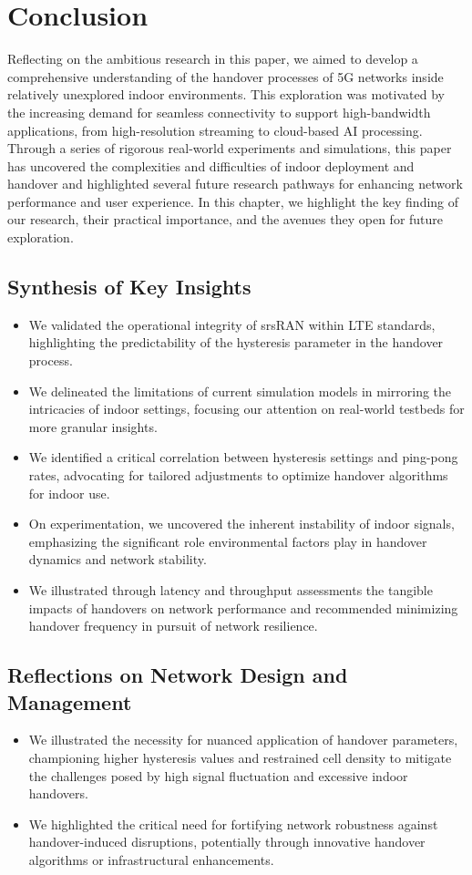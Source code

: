 \chapter{Conclusion}
Reflecting on the ambitious research in this paper, we aimed to develop a comprehensive understanding of the handover processes of 5G networks inside relatively unexplored indoor environments. This exploration was motivated by the increasing demand for seamless connectivity to support high-bandwidth applications, from high-resolution streaming to cloud-based AI processing. Through a series of rigorous real-world experiments and simulations, this paper has uncovered the complexities and difficulties of indoor deployment and handover and highlighted several future research pathways for enhancing network performance and user experience. In this chapter, we highlight the key finding of our research, their practical importance, and the avenues they open for future exploration.

\section{Synthesis of Key Insights}
\begin{itemize}
    \item We validated the operational integrity of srsRAN within LTE standards, highlighting the predictability of the hysteresis parameter in the handover process.
    \item We delineated the limitations of current simulation models in mirroring the intricacies of indoor settings, focusing our attention on real-world testbeds for more granular insights.
    \item We identified a critical correlation between hysteresis settings and ping-pong rates, advocating for tailored adjustments to optimize handover algorithms for indoor use.
    \item On experimentation, we uncovered the inherent instability of indoor signals, emphasizing the significant role environmental factors play in handover dynamics and network stability.
    \item We illustrated through latency and throughput assessments the tangible impacts of handovers on network performance and recommended minimizing handover frequency in pursuit of network resilience.
\end{itemize}

\section{Reflections on Network Design and Management}
\begin{itemize}
    \item We illustrated the necessity for nuanced application of handover parameters, championing higher hysteresis values and restrained cell density to mitigate the challenges posed by high signal fluctuation and excessive indoor handovers.
    \item We highlighted the critical need for fortifying network robustness against handover-induced disruptions, potentially through innovative handover algorithms or infrastructural enhancements.
\end{itemize}

